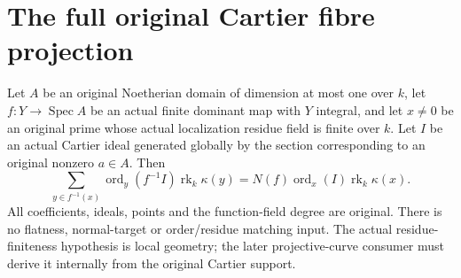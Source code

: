 \section{The full original Cartier fibre projection}

\begin{theorem}
\label{thm:intrinsic-numerical-cartier-principal-full-fibre}
\leanok
Let $A$ be an original Noetherian domain of dimension at most one over
$k$, let $f:Y\to\operatorname{Spec}A$ be an actual finite dominant map
with $Y$ integral, and let $x\ne0$ be an original prime whose actual
localization residue field is finite over $k$. Let $I$ be an actual
Cartier ideal generated globally by the section corresponding to an
original nonzero $a\in A$. Then
\[
 \sum_{y\in f^{-1}(x)}\operatorname{ord}_y(f^{-1}I)
       \operatorname{rk}_k\kappa(y)
 =N(f)\operatorname{ord}_x(I)\operatorname{rk}_k\kappa(x).
\]
All coefficients, ideals, points and the function-field degree are
original. There is no flatness, normal-target or order/residue matching
input. The actual residue-finiteness hypothesis is local geometry;
the later projective-curve consumer must derive it internally from the
original Cartier support.
\end{theorem}
